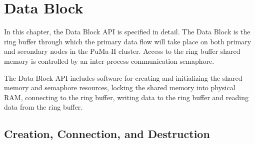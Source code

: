 \chapter{Data Block}

In this chapter, the Data Block API is specified in detail.  The Data
Block is the ring buffer through which the primary data flow will take
place on both primary and secondary nodes in the PuMa-II cluster.
Access to the ring buffer shared memory is controlled by an
inter-process communication semaphore.

The Data Block API includes software for creating and initializing the
shared memory and semaphore resources, locking the shared memory into
physical RAM, connecting to the ring buffer, writing data to the ring
buffer and reading data from the ring buffer.

\section{Creation, Connection, and Destruction}


